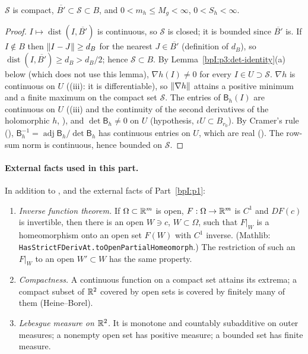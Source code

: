 \begin{lemma}\label{bpI:p3:compact}
$\mathcal S$ is compact, $\overline{B'}\subset\mathcal S\subset B$, and $0<m_h\le M_g<\infty$, $0<S_h<\infty$.
\end{lemma}
\begin{proof}
\label{stepI:p3:cp-compact}
$I\mapsto\operatorname{dist}(I,\overline{B'})$ is continuous, so $\mathcal S$ is closed; it is bounded since $\overline{B'}$ is. If
$I\notin B$ then $\lVert I-J\rVert\ge d_B$ for the nearest $J\in\overline{B'}$ (definition of $d_B$), so $\operatorname{dist}(I,\overline{B'})\ge d_B>d_B/2$;
hence $\mathcal S\subset B$.
\label{stepI:p3:cp-grad}
By Lemma~\ref{bpI:p3:det-identity}(a) below (which does not use this lemma), $\nabla h(I)\ne0$ for every $I\in U\supset\mathcal S$.
$\nabla h$ is continuous on $U$ ((iii): it is differentiable), so $\lVert \nabla h\rVert$ attains a positive minimum and a finite maximum on the compact set $\mathcal S$.
\label{stepI:p3:cp-inverse}
The entries of $\mathsf B_h(I)$ are continuous on $U$ ((iii) and the continuity of the second derivatives of
the holomorphic $h$, ), and $\det\mathsf B_h\ne0$ on $U$ (hypothesis, $\iota U\subset B_{r_0}$). By
Cramer's rule (), $\mathsf B_h^{-1}=\operatorname{adj}\mathsf B_h/\det\mathsf B_h$ has continuous entries on $U$, which are real
(). The row-sum norm is continuous, hence bounded on $\mathcal S$.
\end{proof}

\paragraph{External facts used in this part.} In addition to ,  and the
external facts of Part~\ref{bpI:p1}:
\begin{enumerate}[label=(Y\arabic*),ref=(Y\arabic*)]
\item\label{bpI:p3:ext-ift} \emph{Inverse function theorem.} If $\Omega\subset\mathbb{R}^m$ is open, $F:\Omega\to\mathbb{R}^m$ is $C^1$ and $DF(c)$ is invertible, then there is an
  open $W\ni c$, $W\subset\Omega$, such that $F|_W$ is a homeomorphism onto an open set $F(W)$ with $C^1$ inverse.
  (Mathlib: \nolinkurl{HasStrictFDerivAt.toOpenPartialHomeomorph}.) The restriction of such an $F|_W$ to an open $W'\subset W$ has the same property.
\item\label{bpI:p3:ext-compact} \emph{Compactness.} A continuous function on a compact set attains its extrema; a compact subset of $\mathbb{R}^2$ covered by open sets
  is covered by finitely many of them (Heine--Borel).
\item\label{bpI:p3:ext-lebesgue} \emph{Lebesgue measure on $\mathbb{R}^2$.} It is monotone and countably subadditive on outer measures; a nonempty open set has positive measure; a bounded set has finite measure.
\end{enumerate}

